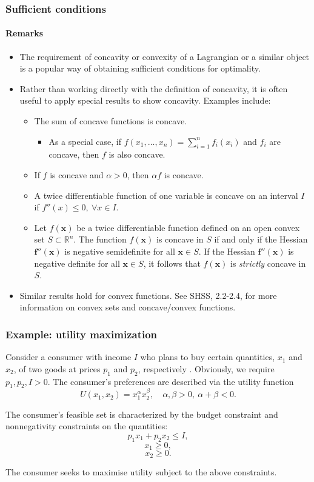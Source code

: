 \documentclass[10pt]{beamer}
\theoremstyle{definition}
\begin{document}
\begin{frame}[fragile]
\frametitle{Sufficient conditions}
\framesubtitle{Remarks}
\begin{itemize}
\item The requirement of concavity or convexity of a Lagrangian or a similar object is a popular way of obtaining sufficient conditions for optimality.
\item Rather than working directly with the definition of concavity, it is often useful to apply special results to show concavity. Examples include:
\begin{itemize}
\item The sum of concave functions is concave.
\begin{itemize}
\item As a special case, if $ f(x_1,\ldots,x_n)=\sum_{i=1}^{n}f_i(x_i) $ and $ f_i $ are concave, then $ f $ is also concave.
\end{itemize}
\item If $ f $ is concave and $ \alpha>0 $, then $ \alpha f $ is concave.
\item A twice differentiable function of one variable is concave on an interval $ I $ if $ f''(x)\leq 0, ~\forall x \in I $.
\item Let $ f(\mathbf{x}) $ be a twice differentiable function defined on an open convex set $ S\subset \mathbb{R}^n $. The function $ f(\mathbf{x}) $ is concave in $ S $ if and only if the Hessian $ \mathbf{f''(x)} $ is negative semidefinite for all $ \mathbf{x}\in S $. If the Hessian $ \mathbf{f''(x)} $ is negative definite for all $ \mathbf{x}\in S $, it follows that $ f(\mathbf{x}) $ is \emph{strictly} concave in $ S $.
\end{itemize}
\item Similar results hold for convex functions. See SHSS, 2.2-2.4, for more information on convex sets and concave/convex functions.
\end{itemize}
\end{frame}

\begin{frame}[fragile]
\frametitle{Example: utility maximization}
Consider a consumer with income $ I $ who plans to buy certain quantities, $ x_1 $ and $ x_2 $, of two goods at prices $ p_1 $ and $ p_2 $, respectively . Obviously, we require $ p_1,p_2,I >0 $. The consumer's preferences are described via the utility function \[ U(x_1,x_2) = x_1^\alpha x_2^\beta,\quad \alpha,\beta >0,~\alpha+\beta < 0. \] 

The consumer's feasible set is characterized by the budget constraint and nonnegativity constraints on the quantities:   \[ p_1 x_1 + p_2 x_2 \leq I , \]  
\[ x_1\geq 0 , \] \[ x_2 \geq 0. \] 

The consumer seeks to maximise utility subject to the above constraints.
\end{frame}
\end{document}

